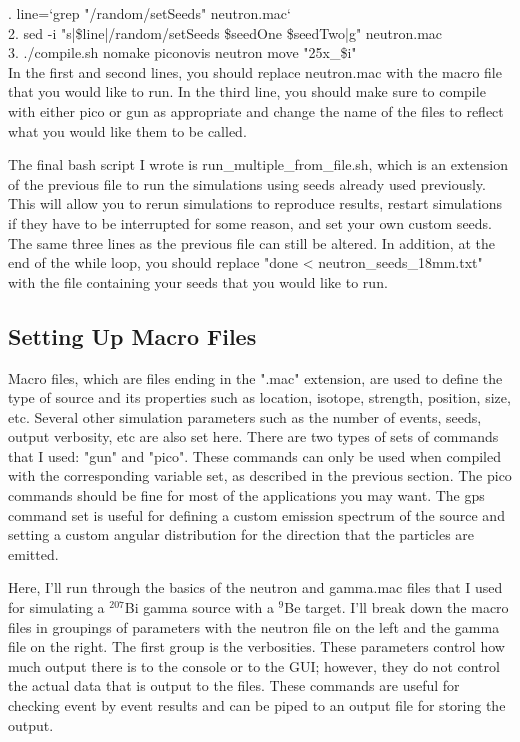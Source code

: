 \documentclass[%
12pt,
twoside,
reprint,
amsmath,amssymb,
aps,
]{article}
\begin{document}
	. line=`grep "/random/setSeeds" neutron.mac` \\
	2. sed -i "s|\$line|/random/setSeeds \$seedOne \$seedTwo|g" neutron.mac \\
	3. ./compile.sh nomake piconovis neutron move "25x\_\$i" \\
	
	\noindent In the first and second lines, you should replace neutron.mac with the macro file that you would like to run. In the third line, you should make sure to compile with either pico or gun as appropriate and change the name of the files to reflect what you would like them to be called. \\
	
	\par The final bash script I wrote is run\_multiple\_from\_file.sh, which is an extension of the previous file to run the simulations using seeds already used previously. This will allow you to rerun simulations to reproduce results, restart simulations if they have to be interrupted for some reason, and set your own custom seeds. The same three lines as the previous file can still be altered. In addition, at the end of the while loop, you should replace "done < neutron\_seeds\_18mm.txt" with the file containing your seeds that you would like to run.
	
	\subsection{Setting Up Macro Files}

	\par Macro files, which are files ending in the ".mac" extension, are used to define the type of source and its properties such as location, isotope, strength, position, size, etc. Several other simulation parameters such as the number of events, seeds, output verbosity, etc are also set here. There are two types of sets of commands that I used: "gun" and "pico". These commands can only be used when compiled with the corresponding variable set, as described in the previous section. The pico commands should be fine for most of the applications you may want. The gps command set is useful for defining a custom emission spectrum of the source and setting a custom angular distribution for the direction that the particles are emitted.
	
	\par Here, I'll run through the basics of the neutron and gamma.mac files that I used for simulating a $^{207}$Bi gamma source with a $^9$Be target. I'll break down the macro files in groupings of parameters with the neutron file on the left and the gamma file on the right. The first group is the verbosities. These parameters control how much output there is to the console or to the GUI; however, they do not control the actual data that is output to the files. These commands are useful for checking event by event results and can be piped to an output file for storing the output.
	
\end{document}
